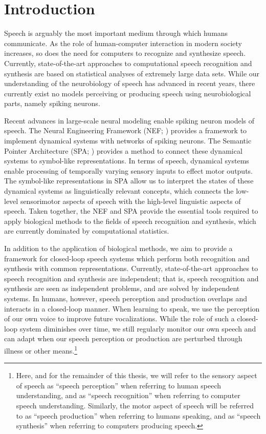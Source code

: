 \chapter{Introduction}

Speech is arguably the most important
medium through which humans communicate.
As the role of human-computer interaction
in modern society increases,
so does the need for computers
to recognize and synthesize speech.
Currently, state-of-the-art approaches
to computational
speech recognition and synthesis
are based on statistical analyses
of extremely large data sets.
While our understanding
of the neurobiology of speech has advanced
in recent years,
there currently exist no
models perceiving or producing speech
using neurobiological parts,
namely spiking neurons.

Recent advances in large-scale neural modeling
enable spiking neuron models of speech.
The Neural Engineering Framework (NEF; \cite{eliasmith2004})
provides a framework to implement
dynamical systems with networks of spiking neurons.
The Semantic Pointer Architecture (SPA; \cite{eliasmith2013})
provides a method to connect these dynamical systems
to symbol-like representations.
In terms of speech,
dynamical systems enable processing of
temporally varying sensory inputs
to effect motor outputs.
The symbol-like representations in SPA
allow us to interpret the states
of these dynamical systems
as linguistically relevant concepts,
which connects the low-level
sensorimotor aspects of speech
with the high-level linguistic aspects of speech.
Taken together, the NEF and SPA
provide the essential tools required
to apply biological methods
to the fields of
speech recognition and synthesis,
which are currently dominated
by computational statistics.

In addition to the application of biological methods,
we aim to provide a framework for
closed-loop speech systems
which perform both recognition and synthesis
with common representations.
Currently, state-of-the-art approaches
to speech recognition and synthesis
are independent;
that is, speech recognition and synthesis
are seen as independent problems,
and are solved by independent systems.
In humans, however,
speech perception and production
overlaps and interacts in a closed-loop manner.
When learning to speak,
we use the perception of our own voice
to improve future vocalizations.
While the role of such a closed-loop system
diminishes over time,
we still regularly monitor
our own speech and can adapt
when our speech perception or production
are perturbed through illness
or other means.\footnote{
  Here, and for the remainder of this thesis,
  we will refer to the sensory aspect
  of speech as ``speech perception''
  when referring to human speech understanding,
  and as ``speech recognition''
  when referring to computer speech understanding.
  Similarly, the motor aspect of speech
  will be referred to as
  ``speech production''
  when referring to humans speaking,
  and as ``speech synthesis''
  when referring to computers producing speech.}

